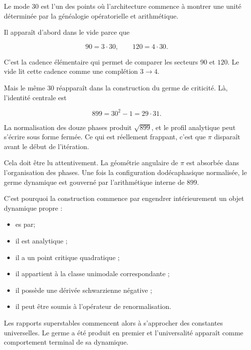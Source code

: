 Le mode \(30\) est l’un des points où l’architecture commence à montrer une unité déterminée par la généalogie opératorielle et arithmétique.\par

Il apparaît d’abord dans le vide parce que\par

\[
90=3\cdot30,
\qquad
120=4\cdot30.
\]

C’est la cadence élémentaire qui permet de comparer les secteurs \(90\) et \(120\). Le vide lit cette cadence comme une complétion \(3\to4\).\par

Mais le même \(30\) réapparaît dans la construction du germe de criticité. Là, l’identité centrale est\par

\[
899=30^2-1=29\cdot31.
\]

La normalisation des douze phases produit \(\sqrt{899}\), et le profil analytique peut s’écrire sous forme fermée. Ce qui est réellement frappant, c’est que \(\pi\) disparaît avant le début de l’itération.\par

Cela doit être lu attentivement. La géométrie angulaire de \(\pi\) est absorbée dans l’organisation des phases. Une fois la configuration dodécaphasique normalisée, le germe dynamique est gouverné par l’arithmétique interne de \(899\).\par

C’est pourquoi la construction commence par engendrer intérieurement un objet dynamique propre :\par

\begin{itemize}[leftmargin=*,itemsep=0.35em]
\item es par;
\item il est analytique ;
\item il a un point critique quadratique ;
\item il appartient à la classe unimodale correspondante ;
\item il possède une dérivée schwarzienne négative ;
\item il peut être soumis à l’opérateur de renormalisation.
\end{itemize}

Les rapports superstables commencent alors à s’approcher des constantes universelles. Le germe a été produit en premier et l’universalité apparaît comme comportement terminal de sa dynamique.\par

